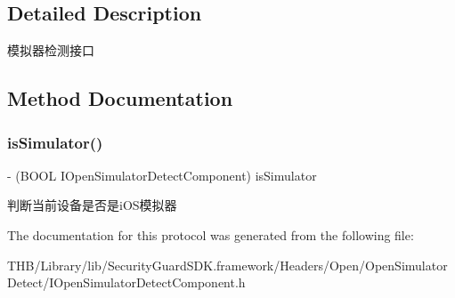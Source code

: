 \subsection{Detailed Description}
模拟器检测接口 

\subsection{Method Documentation}
\mbox{\label{protocol_i_open_simulator_detect_component_01-p_aa65d30ce00d7936016fc06ec0f5dddd6}} 
\subsubsection{\texorpdfstring{is\+Simulator()}{isSimulator()}}
{\footnotesize\ttfamily -\/ (B\+O\+OL I\+Open\+Simulator\+Detect\+Component) is\+Simulator \begin{DoxyParamCaption}{ }\end{DoxyParamCaption}}

判断当前设备是否是i\+O\+S模拟器 

The documentation for this protocol was generated from the following file\+:\begin{DoxyCompactItemize}
\item 
T\+H\+B/\+Library/lib/\+Security\+Guard\+S\+D\+K.\+framework/\+Headers/\+Open/\+Open\+Simulator\+Detect/I\+Open\+Simulator\+Detect\+Component.\+h\end{DoxyCompactItemize}
